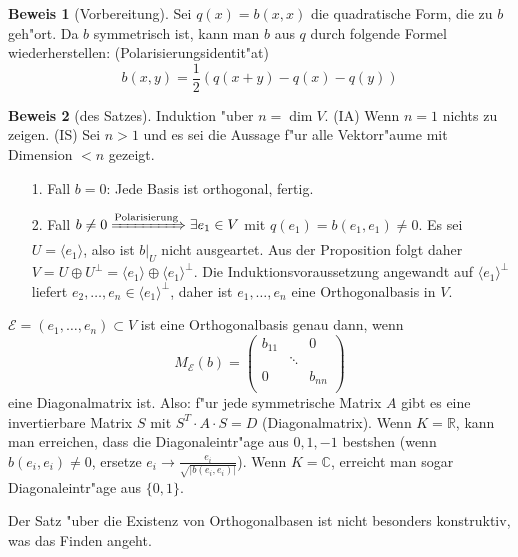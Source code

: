 \documentclass[oneside,fontsize=11pt,paper=a4,BCOR=0mm,DIV=12,automark,headsepline]{scrbook}
\theoremstyle{remark}
\theoremstyle{definition}
\theoremstyle{definition}
\newtheorem*{prof}{Beweis}
\theoremstyle{remark}
\begin{document}
\begin{prof}[Vorbereitung]
  Sei $q(x)=b(x,x)$ die quadratische Form, die zu $b$ geh"ort. Da $b$ symmetrisch
  ist, kann man $b$ aus $q$ durch folgende Formel wiederherstellen:
  (Polarisierungsidentit"at)
  \[
    b(x,y) = \frac{1}{2} (q(x+y) - q(x) - q(y))
  \]
\end{prof}
\begin{prof}[des Satzes]
  Induktion "uber $n=\dim V$. 
  (IA) Wenn $n=1$ nichts zu zeigen.
  (IS) Sei $n>1$ und es sei die Aussage f"ur alle Vektorr"aume mit Dimension $<n$
    gezeigt.
    \begin{itemize}
    \item[1. Fall] $b=0$: Jede Basis ist orthogonal, fertig.
    \item[2. Fall] $b\neq 0\xRightarrow{\text{Polarisierung}} \exists e_1\in V$ mit
      $q(e_1)=b(e_1,e_1)\neq 0$. Es sei $U=\langle e_1 \rangle$, also ist \(b|_U\) nicht ausgeartet. Aus der Proposition folgt daher \(V = U\oplus U^\perp = \langle e_1\rangle\oplus\langle e_1\rangle^\perp\). Die Induktionsvoraussetzung angewandt auf \(\langle e_1\rangle^\perp\) liefert \(e_2,\dots,e_n\in \langle e_1\rangle^\perp\), daher ist \(e_1,\dots, e_n\) eine Orthogonalbasis in \(V\).
    \end{itemize}
\end{prof}

\begin{relation}
  $\mathcal{E}=(e_1,\ldots, e_n) \subset V$ ist eine Orthogonalbasis genau dann, wenn \[
  M_{\mathcal{E}}(b)=
  \begin{pmatrix}
    b_{11} & & 0 \\
    & \ddots & \\
    0 & & b_{nn} \\
  \end{pmatrix}
  \] eine Diagonalmatrix ist. Also: f"ur jede symmetrische Matrix $A$ gibt es eine invertierbare Matrix $S$
  mit $S^T\cdot A\cdot S = D$ (Diagonalmatrix). Wenn $K=\mathbb{R}$, kann man
  erreichen, dass die Diagonaleintr"age aus ${0,1,-1}$ bestshen (wenn
  $b(e_i,e_i)\not= 0$, ersetze $e_i\rightarrow\frac{e_i}{\sqrt{|b(e_i, e_i)|}}$). Wenn \(K = \mathbb{C}\), erreicht man sogar Diagonaleintr"age aus \(\{0, 1\}\).
\end{relation}

Der Satz "uber die Existenz von Orthogonalbasen ist nicht besonders konstruktiv, was das Finden angeht.
\end{document}
